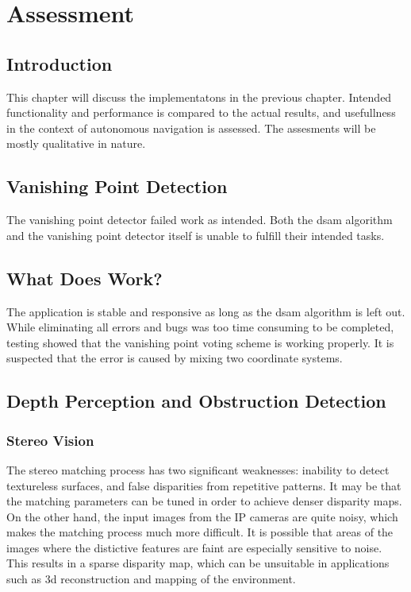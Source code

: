 \chapter{Assessment}\label{chp:assessment}

\section{Introduction}

This chapter will discuss the implementatons in the previous chapter. Intended functionality and performance is compared to the actual results, and usefullness in the context of autonomous navigation is assessed. The assesments will be mostly qualitative in nature.

\section{Vanishing Point Detection}

The vanishing point detector failed work as intended. Both the \gls{dsam} algorithm and the vanishing point detector itself is unable to fulfill their intended tasks. 

\section{What Does Work?}

The application is stable and responsive as long as the \gls{dsam} algorithm is left out. While eliminating all errors and bugs was too time consuming to be completed, testing showed that the vanishing point voting scheme is working properly. It is suspected that the error is caused by mixing two coordinate systems.

\section{Depth Perception and Obstruction Detection}

\subsection{Stereo Vision}

The stereo matching process has two significant weaknesses: inability to detect textureless surfaces, and false disparities from repetitive patterns. It may be that the matching parameters can be tuned in order to achieve denser disparity maps. On the other hand, the input images from the IP cameras are quite noisy, which makes the matching process much more difficult. It is possible that areas of the images where the distictive features are faint are especially sensitive to noise. This results in a sparse disparity map, which can be unsuitable in applications such as 3d reconstruction and mapping of the environment.

